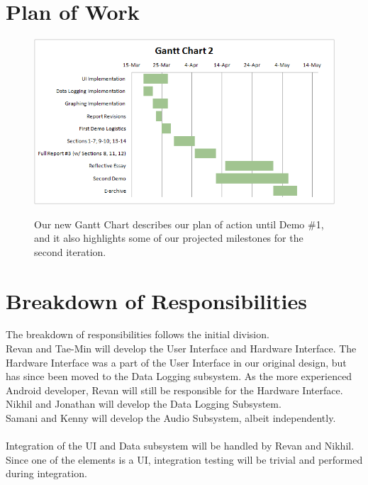 \documentclass[letterpaper,english, 12pt]{scrreprt}
\begin{document}
\section{Plan of Work}
\begin{figure}[H]
	\centering
	\includegraphics{img/Gantt_Chart2.png}\\
	\caption{Our new Gantt Chart describes our plan of action until Demo \#1, and it also highlights some of our projected milestones for the second iteration.} 
\end{figure}

\section{Breakdown of Responsibilities}
The breakdown of responsibilities follows the initial division.
\\
Revan and Tae-Min will develop the User Interface and Hardware Interface.
The Hardware Interface was a part of the User Interface in our original design, but has since been moved to the Data Logging subsystem.
As the more experienced Android developer, Revan will still be responsible for the Hardware Interface.
\\
Nikhil and Jonathan will develop the Data Logging Subsystem.
\\
Samani and Kenny will develop the Audio Subsystem, albeit independently.
\\
\\
Integration of the UI and Data subsystem will be handled by Revan and Nikhil.
\\
Since one of the elements is a UI, integration testing will be trivial and performed during integration.
\end{document}
